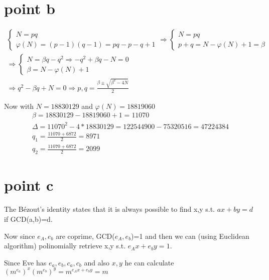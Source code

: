 \newpage
\section{point b}

\begin{gather*}
    \begin{cases}
        N=pq \\
        \varphi(N)=(p-1)(q-1)=pq-p-q+1
        \end{cases}
        \Rightarrow
    \begin{cases}
            N=pq\\
            p+q=N-\varphi(N)+1=\beta 
    \end{cases}\\
    \Rightarrow
    \begin{cases}
            N=\beta q -q^2 \Rightarrow -q^2+\beta q-N=0\\
            \beta=N-\varphi(N)+1
    \end{cases}\\
    \Rightarrow q^2-\beta q+N=0 \Rightarrow p,q=\frac{\beta \pm \sqrt{\beta^2-4N}}{2}
\end{gather*}

Now with $N= 18830129$ and $\varphi(N) = 18819060$\\

\begin{gather*}
    \beta=18830129 - 18819060 +1 = 11070\\
    \Delta=11070^2-4*18830129=122544900-75320516=47224384\\
    q_1=\frac{11070+6872}{2}=8971\\
    q_2=\frac{11070+6872}{2}=2099
\end{gather*}

\section{point c}

The Bézout’s identity states that it is always possible to find x,y s.t. 
$ax+by=d$ if GCD(a,b)=d.

Now since $e_A,e_b$ are coprime, GCD($e_A,e_b$)=1 and then we can (using Euclidean algorithm) polinomially retrieve x,y s.t. $e_A x + e_b y =1$.

Since Eve has $e_a,e_b,c_a,c_b$ and also $x,y$ he can calculate $(m^{e_a})^x (m^{e_b})^y=m^{e_A x + e_b y}=m$

